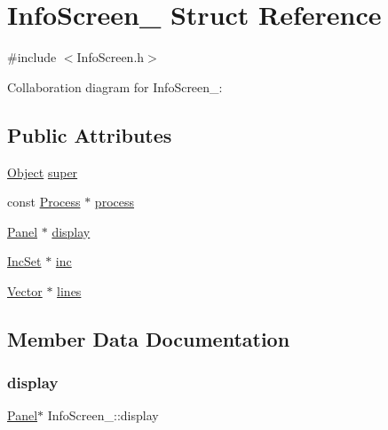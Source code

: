\hypertarget{structInfoScreen__}{}\section{Info\+Screen\+\_\+ Struct Reference}
\label{structInfoScreen__}


{\ttfamily \#include $<$Info\+Screen.\+h$>$}



Collaboration diagram for Info\+Screen\+\_\+\+:
\subsection*{Public Attributes}
\begin{DoxyCompactItemize}
\item 
\hyperlink{Object_8h_a32b67ad7134cd31b5ec5ed9c6a2d3978}{Object} \hyperlink{structInfoScreen___a82e56554b0dd9bca2664e9facc374c5c}{super}
\item 
const \hyperlink{Process_8h_a20673e8fa40981a168bf0e196c4cef3b}{Process} $\ast$ \hyperlink{structInfoScreen___a7520e11621ed0404ad6cc18d74381117}{process}
\item 
\hyperlink{Panel_8h_a034d4c16521db412dc7a1e8536d16fae}{Panel} $\ast$ \hyperlink{structInfoScreen___a79bd5dd95320c75e404761da242636ca}{display}
\item 
\hyperlink{IncSet_8h_a5a093913f0cffb0939e9000ae05e6604}{Inc\+Set} $\ast$ \hyperlink{structInfoScreen___a20a3a5afb469b3c3f37bedca88845b39}{inc}
\item 
\hyperlink{Vector_8h_a8297b82ce917cd21838596b7e3a7faa8}{Vector} $\ast$ \hyperlink{structInfoScreen___acba1bc153c2fe9cc721f9850887a4eae}{lines}
\end{DoxyCompactItemize}


\subsection{Member Data Documentation}
\mbox{\label{structInfoScreen___a79bd5dd95320c75e404761da242636ca}} 
\subsubsection{\texorpdfstring{display}{display}}
{\footnotesize\ttfamily \hyperlink{Panel_8h_a034d4c16521db412dc7a1e8536d16fae}{Panel}$\ast$ Info\+Screen\+\_\+\+::display}


